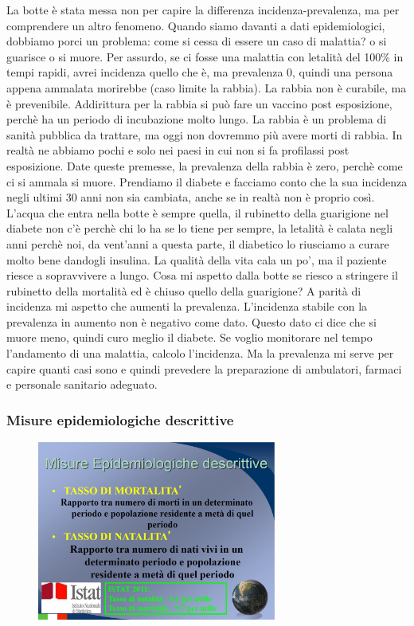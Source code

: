 La botte è stata messa non per capire la differenza
incidenza-prevalenza, ma per comprendere un altro fenomeno. Quando siamo
davanti a dati epidemiologici, dobbiamo porci un problema: come si cessa
di essere un caso di malattia? o si guarisce o si muore. Per assurdo, se
ci fosse una malattia con letalità del 100\% in tempi rapidi, avrei
incidenza quello che è, ma prevalenza 0, quindi una persona appena
ammalata morirebbe (caso limite la rabbia). La rabbia non è curabile, ma
è prevenibile. Addirittura per la rabbia si può fare un vaccino post
esposizione, perchè ha un periodo di incubazione molto lungo. La rabbia
è un problema di sanità pubblica da trattare, ma oggi non dovremmo più
avere morti di rabbia. In realtà ne abbiamo pochi e solo nei paesi in
cui non si fa profilassi post esposizione. Date queste premesse, la
prevalenza della rabbia è zero, perchè come ci si ammala si muore.
Prendiamo il diabete e facciamo conto che la sua incidenza negli ultimi
30 anni non sia cambiata, anche se in realtà non è proprio così. L'acqua
che entra nella botte è sempre quella, il rubinetto della guarigione nel
diabete non c'è perchè chi lo ha se lo tiene per sempre, la letalità è
calata negli anni perchè noi, da vent'anni a questa parte, il diabetico
lo riusciamo a curare molto bene dandogli insulina. La qualità della
vita cala un po', ma il paziente riesce a sopravvivere a lungo. Cosa mi
aspetto dalla botte se riesco a stringere il rubinetto della mortalità
ed è chiuso quello della guarigione? A parità di incidenza mi aspetto
che aumenti la prevalenza. L'incidenza stabile con la prevalenza in
aumento non è negativo come dato. Questo dato ci dice che si muore meno,
quindi curo meglio il diabete. Se voglio monitorare nel tempo
l'andamento di una malattia, calcolo l'incidenza. Ma la prevalenza mi
serve per capire quanti casi sono e quindi prevedere la preparazione di
ambulatori, farmaci e personale sanitario adeguato.

\subsubsection{Misure epidemiologiche descrittive}


\begin{figure}[!ht]
\centering
	\includegraphics[width=0.7\textwidth]{03/image11.png}
\end{figure}

